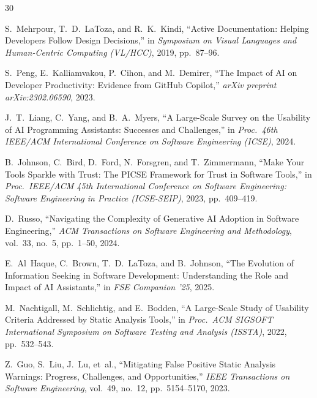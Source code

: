 \documentclass[conference]{IEEEtran}
\begin{document}

\begin{thebibliography}{30}


S.~Mehrpour, T.~D.~LaToza, and R.~K.~Kindi,
``Active Documentation: Helping Developers Follow Design Decisions,''
in \emph{Symposium on Visual Languages and Human-Centric Computing (VL/HCC)}, 2019, pp.~87--96.

S.~Peng, E.~Kalliamvakou, P.~Cihon, and M.~Demirer,
``The Impact of AI on Developer Productivity: Evidence from GitHub Copilot,''
\emph{arXiv preprint arXiv:2302.06590}, 2023.

J.~T.~Liang, C.~Yang, and B.~A.~Myers,
``A Large-Scale Survey on the Usability of AI Programming Assistants: Successes and Challenges,''
in \emph{Proc.\ 46th IEEE/ACM International Conference on Software Engineering (ICSE)}, 2024.

B.~Johnson, C.~Bird, D.~Ford, N.~Forsgren, and T.~Zimmermann,
``Make Your Tools Sparkle with Trust: The PICSE Framework for Trust in Software Tools,''
in \emph{Proc.\ IEEE/ACM 45th International Conference on Software Engineering: Software Engineering in Practice (ICSE-SEIP)}, 2023, pp.~409--419.

D.~Russo,
``Navigating the Complexity of Generative AI Adoption in Software Engineering,''
\emph{ACM Transactions on Software Engineering and Methodology}, vol.~33, no.~5, pp.~1--50, 2024.

E.~Al~Haque, C.~Brown, T.~D.~LaToza, and B.~Johnson,
``The Evolution of Information Seeking in Software Development: Understanding the Role and Impact of AI Assistants,''
in \emph{FSE Companion '25}, 2025.


M.~Nachtigall, M.~Schlichtig, and E.~Bodden,
``A Large-Scale Study of Usability Criteria Addressed by Static Analysis Tools,''
in \emph{Proc.\ ACM SIGSOFT International Symposium on Software Testing and Analysis (ISSTA)}, 2022, pp.~532--543.

Z.~Guo, S.~Liu, J.~Lu, et~al.,
``Mitigating False Positive Static Analysis Warnings: Progress, Challenges, and Opportunities,''
\emph{IEEE Transactions on Software Engineering}, vol.~49, no.~12, pp.~5154--5170, 2023.



\end{thebibliography}
\end{document}
